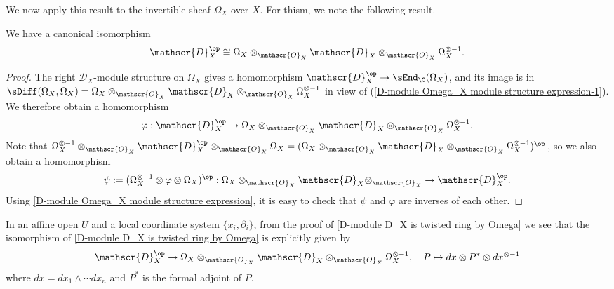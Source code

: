 We now apply this result to the invertible sheaf $\Omega_X$ over $X$. For thism, we note the following result.
\begin{proposition}\label{D-module D_X is twisted ring by Omega}
We have a canonical isomorphism
\[\mathscr{D}_X^{\op}\cong\Omega_X\otimes_{\mathscr{O}_X}\mathscr{D}_X\otimes_{\mathscr{O}_X}\Omega_X^{\otimes -1}.\]
\end{proposition}
\begin{proof}
The right $\mathscr{D}_X$-module structure on $\Omega_X$ gives a homomorphism $\mathscr{D}_X^{\op}\to\sEnd_\C(\Omega_X)$, and its image is in $\sDiff(\Omega_X,\Omega_X)=\Omega_X\otimes_{\mathscr{O}_X}\mathscr{D}_X\otimes_{\mathscr{O}_X}\Omega_X^{\otimes -1}$ in view of (\ref{D-module Omega_X module structure expression-1}). We therefore obtain a homomorphism
\[\varphi:\mathscr{D}_X^{\op}\to\Omega_X\otimes_{\mathscr{O}_X}\mathscr{D}_X\otimes_{\mathscr{O}_X}\Omega_X^{\otimes -1}.\]
Note that $\Omega_X^{\otimes -1}\otimes_{\mathscr{O}_X}\mathscr{D}_X^{\op}\otimes_{\mathscr{O}_X}\Omega_X=(\Omega_X\otimes_{\mathscr{O}_X}\mathscr{D}_X\otimes_{\mathscr{O}_X}\Omega_X^{\otimes -1})^{\op}$, so we also obtain a homomorphism
\[\psi:=(\Omega_X^{\otimes -1}\otimes\varphi\otimes\Omega_X)^{\op}:\Omega_X\otimes_{\mathscr{O}_X}\mathscr{D}_X\otimes_{\mathscr{O}_X}\to \mathscr{D}_X^{\op}.\]
Using \cref{D-module Omega_X module structure expression}, it is easy to check that $\psi$ and $\varphi$ are inverses of each other.
\end{proof}

\begin{remark}
In an affine open $U$ and a local coordinate system $\{x_i,\partial_i\}$, from the proof of \cref{D-module D_X is twisted ring by Omega} we see that the isomorphism of \cref{D-module D_X is twisted ring by Omega} is explicitly given by
\[\mathscr{D}_X^{\op}\to \Omega_X\otimes_{\mathscr{O}_X}\mathscr{D}_X\otimes_{\mathscr{O}_X}\Omega_X^{\otimes -1},\quad P\mapsto dx\otimes P^*\otimes dx^{\otimes -1}\]
where $dx=dx_1\wedge\cdots dx_n$ and $P^*$ is the formal adjoint of $P$.  
\end{remark}

